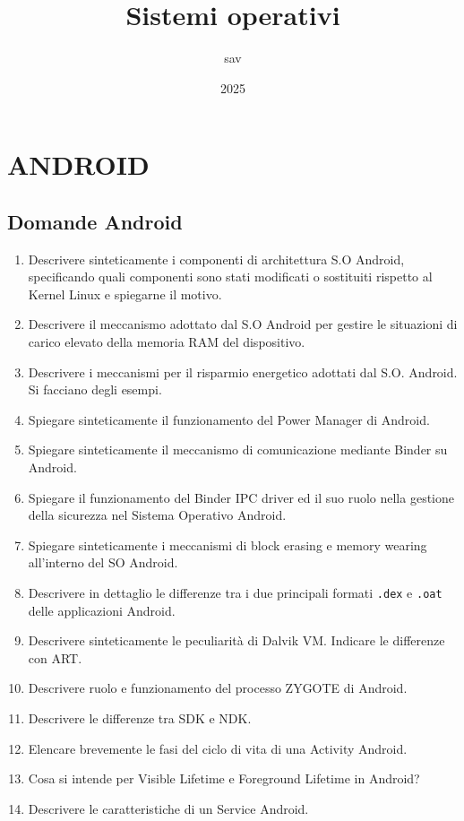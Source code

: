 \documentclass{report}
\title{Sistemi operativi}
\author{sav}
\date{2025}
\begin{document}
\maketitle
\tableofcontents


\chapter{ANDROID}
\section{Domande Android}
\begin{enumerate}
    \item Descrivere sinteticamente i componenti di architettura S.O Android, specificando quali componenti sono stati modificati o sostituiti rispetto al Kernel Linux e spiegarne il motivo.
    \item Descrivere il meccanismo adottato dal S.O Android per gestire le situazioni di carico elevato della memoria RAM del dispositivo.
    \item Descrivere i meccanismi per il risparmio energetico adottati dal S.O. Android. Si facciano degli esempi.
    \item Spiegare sinteticamente il funzionamento del Power Manager di Android.
    \item Spiegare sinteticamente il meccanismo di comunicazione mediante Binder su Android.
    \item Spiegare il funzionamento del Binder IPC driver ed il suo ruolo nella gestione della sicurezza nel Sistema Operativo Android.
    \item Spiegare sinteticamente i meccanismi di block erasing e memory wearing all’interno del SO Android.
    \item Descrivere in dettaglio le differenze tra i due principali formati \texttt{.dex} e \texttt{.oat} delle applicazioni Android.
    \item Descrivere sinteticamente le peculiarità di Dalvik VM. Indicare le differenze con ART.
    \item Descrivere ruolo e funzionamento del processo ZYGOTE di Android.
    \item Descrivere le differenze tra SDK e NDK.
    \item Elencare brevemente le fasi del ciclo di vita di una Activity Android.
    \item Cosa si intende per Visible Lifetime e Foreground Lifetime in Android?
    \item Descrivere le caratteristiche di un Service Android.

\end{enumerate}
\end{document}
